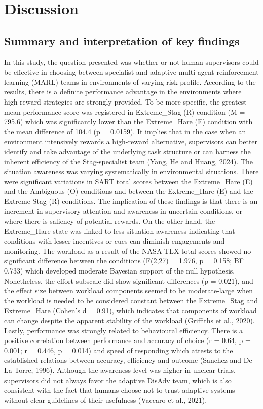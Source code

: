 \documentclass[
]{article}
\begin{document}
\section{Discussion}\label{discussion}

\subsection{Summary and interpretation of key
findings}\label{summary-and-interpretation-of-key-findings}

In this study, the question presented was whether or not human
supervisors could be effective in choosing between specialist and
adaptive multi-agent reinforcement learning (MARL) teams in environments
of varying risk profile. According to the results, there is a definite
performance advantage in the environments where high-reward strategies
are strongly provided. To be more specific, the greatest mean
performance score was registered in Extreme\_Stag (R) condition (M =
795.6) which was significantly lower than the Extreme\_Hare (E)
condition with the mean difference of 104.4 (p = 0.0159). It implies
that in the case when an environment intensively rewards a high-reward
alternative, supervisors can better identify and take advantage of the
underlying task structure or can harness the inherent efficiency of the
Stag-specialist team (Yang, He and Huang, 2024). The situation awareness
was varying systematically in environmental situations. There were
significant variations in SART total scores between the Extreme\_Hare
(E) and the Ambiguous (O) conditions and between the Extreme\_Hare (E)
and the Extreme Stag (R) conditions. The implication of these findings
is that there is an increment in supervisory attention and awareness in
uncertain conditions, or where there is saliency of potential rewards.
On the other hand, the Extreme\_Hare state was linked to less situation
awareness indicating that conditions with lesser incentives or cues can
diminish engagements and monitoring. The workload as a result of the
NASA-TLX total scores showed no significant difference between the
conditions (F(2,27) = 1.976, p = 0.158; BF = 0.733) which developed
moderate Bayesian support of the null hypothesis. Nonetheless, the
effort subscale did show significant differences (p = 0.021), and the
effect size between workload components seemed to be moderate-large when
the workload is needed to be considered constant between the
Extreme\_Stag and Extreme\_Hare (Cohen's d = 0.91), which indicates that
components of workload can change despite the apparent stability of the
workload (Griffiths et al., 2020). Lastly, performance was strongly
related to behavioural efficiency. There is a positive correlation
between performance and accuracy of choice (r = 0.64, p = 0.001; r =
0.446, p = 0.014) and speed of responding which attests to the
established relations between accuracy, efficiency and outcome (Sanchez
and De La Torre, 1996). Although the awareness level was higher in
unclear trials, supervisors did not always favor the adaptive DisAdv
team, which is also consistent with the fact that humans choose not to
trust adaptive systems without clear guidelines of their usefulness
(Vaccaro et al., 2021).
\end{document}
